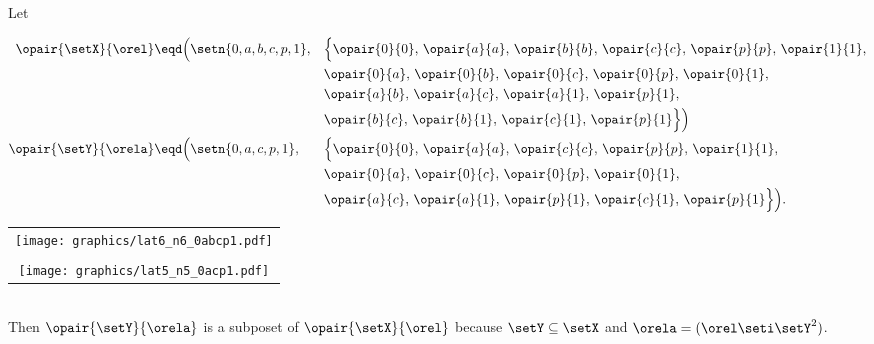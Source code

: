 \begin{example}
Let\\
\begin{minipage}{12\tw/16}%
\begin{align*}
  \opair{\setX}{\orel}
    &\eqd \Big( \setn{0,a,b,c,p,1},
    &&    \Big\{\opair{0}{0},\,\opair{a}{a},\,\opair{b}{b},\,\opair{c}{c},\,\opair{p}{p},\,\opair{1}{1},
  \\&&&   \opair{0}{a},\,\opair{0}{b},\,\opair{0}{c},\,\opair{0}{p},\,\opair{0}{1},
  \\&&&   \opair{a}{b},\,\opair{a}{c},\,\opair{a}{1},\,\opair{p}{1},
  \\&&&   \opair{b}{c},\,\opair{b}{1},\,\opair{c}{1},\,\opair{p}{1} \Big\}\Big)
  \\
  \opair{\setY}{\orela}
    &\eqd \Big( \setn{0,a,c,p,1},
    &&    \Big\{\opair{0}{0},\,\opair{a}{a},\,\opair{c}{c},\,\opair{p}{p},\,\opair{1}{1},
  \\&&&   \opair{0}{a},\,\opair{0}{c},\,\opair{0}{p},\,\opair{0}{1},
  \\&&&   \opair{a}{c},\,\opair{a}{1},\,\opair{p}{1},\,\opair{c}{1},\,\opair{p}{1} \Big\}\Big).
\end{align*}
\end{minipage}%
\begin{minipage}{4\tw/16}%
\begin{center}%
\begin{tabular}{c}%
   \texttt{[image: graphics/lat6\_n6\_0abcp1.pdf]}
\\\\
  \texttt{[image: graphics/lat5\_n5\_0acp1.pdf]}
\end{tabular}
\end{center}%
\end{minipage}
\\Then $\opair{\setY}{\orela}$ is a subposet of $\opair{\setX}{\orel}$ because
$\setY\subseteq\setX$ and $\orela=(\orel\seti\setY^2)$.
\end{example}

